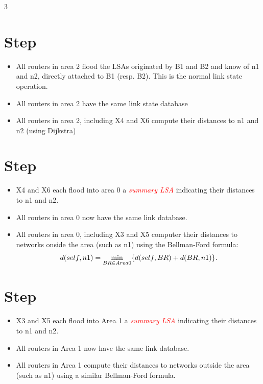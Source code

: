 \documentclass[11pt]{article}
\begin{document}
\begin{multicols}{3}

\section{Step}
\begin{itemize}
	\item All routers in area 2 flood the LSAs originated by B1 and B2 and know of n1 and n2, directly attached to B1 (resp. B2). This is the normal link state operation.
	\item All routers in area 2 have the same link state database
	\item All routers in area 2, including X4 and X6 compute their distances to n1 and n2 (using Dijkstra)
\end{itemize}

\section{Step}
\begin{itemize}
	\item X4 and X6 each flood into area 0 a \textcolor{red}{\textit{summary LSA}} indicating their distances to n1 and n2.
	\item All routers in area 0 now have the same link database.
	\item All routers in area 0, including X3 and X5 computer their distances to networks onside the area (such as n1) using the Bellman-Ford formula:
		\[
			d(self, n1) =\\ \underset{BR \in Area0}{\min} \{ d(self, BR) + d(BR, n1)\}
		.\] 

\end{itemize}

\section{Step}
\begin{itemize}
	\item X3 and X5 each flood into Area 1 a \textcolor{red}{\textit{summary LSA}} indicating their distances to n1 and n2.
	\item All routers in Area 1 now have the same link database.
	\item All routers in Area 1 compute their distances to networks outside the area (such as n1) using a similar Bellman-Ford formula. 
\end{itemize}
\end{multicols}
\end{document}

